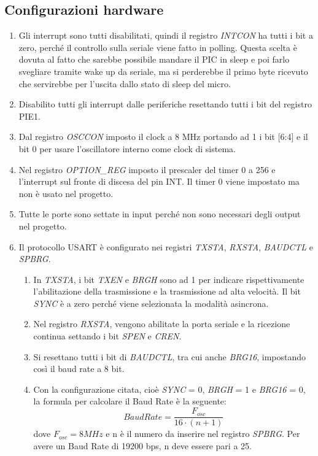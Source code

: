 \documentclass{article}
\begin{document}
	\subsection{Configurazioni hardware}
	\begin{enumerate}
		\item Gli interrupt sono tutti disabilitati, quindi il registro \emph{INTCON} ha tutti i bit a zero, perché il controllo sulla seriale viene fatto in polling. Questa scelta è dovuta al fatto che sarebbe possibile mandare il PIC in sleep e poi farlo svegliare tramite wake up da seriale, ma si perderebbe il primo byte ricevuto che servirebbe per l'uscita dallo stato di sleep del micro.	
		\item Disabilito tutti gli interrupt dalle periferiche resettando tutti i bit del registro PIE1.
		\item Dal registro \emph{OSCCON} imposto il clock a 8 MHz portando ad 1 i bit [6:4] e il bit 0 per usare l’oscillatore interno come clock di sistema.
		\item Nel registro \emph{OPTION\_REG} imposto il prescaler del timer 0 a 256 e l’interrupt sul fronte di discesa del pin INT. Il timer 0 viene impostato ma non è usato nel progetto.
		\item Tutte le porte sono settate in input perché non sono necessari degli output nel progetto.
		\item Il protocollo USART è configurato nei registri \emph{TXSTA}, \emph{RXSTA}, \emph{BAUDCTL} e \emph{SPBRG}.
		\begin {enumerate}
			\item In \emph{TXSTA}, i bit \emph{TXEN} e \emph{BRGH} sono ad 1 per indicare rispettivamente l'abilitazione della trasmissione e la trasmissione ad alta velocità. Il bit \emph{SYNC} è a zero perché viene selezionata la modalità asincrona.
			\item Nel registro \emph{RXSTA}, vengono abilitate la porta seriale e la ricezione continua settando i bit \emph{SPEN} e \emph{CREN}. 
			\item Si resettano tutti i bit di \emph{BAUDCTL}, tra cui anche \emph{BRG16}, impostando così il baud rate a 8 bit. 
			\item Con la configurazione citata, cioè \emph{SYNC} = 0, \emph{BRGH} = 1 e \emph{BRG16} = 0, la formula per calcolare il Baud Rate è la seguente: $$ Baud Rate = \frac{F_{osc}}{16\cdot(n+1)} $$ dove $F_{osc} = 8 MHz$ e n è il numero da inserire nel registro \emph{SPBRG}. Per avere un Baud Rate di 19200 bps, n deve essere pari a 25.
		\end{enumerate}
	\end{enumerate}
\end{document}
